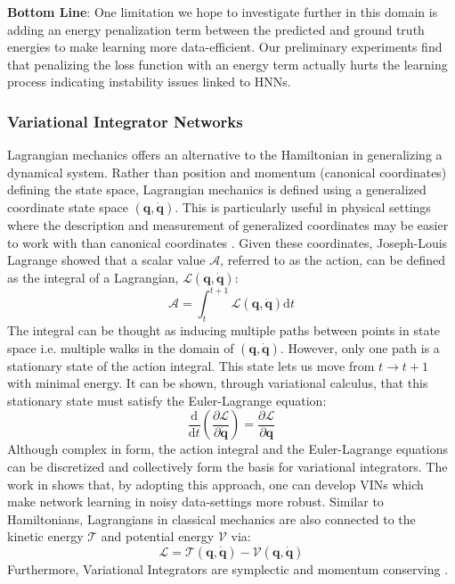 \documentclass{article}
\begin{document}
\textbf{Bottom Line}: One limitation we hope to investigate further in this domain is adding an energy penalization term between the predicted and ground truth energies to make learning more data-efficient. Our preliminary experiments find that penalizing the loss function with an energy term actually hurts the learning process indicating instability issues linked to HNNs. 

\subsubsection{Variational Integrator Networks}

Lagrangian mechanics offers an alternative to the Hamiltonian in generalizing a dynamical system. Rather than position and momentum (canonical coordinates) defining the state space, Lagrangian mechanics is defined using a generalized coordinate state space $(\mathbf{q},\dot{\mathbf{q}})$. This is particularly useful in physical settings where the description and measurement of generalized coordinates may be easier to work with than canonical coordinates \cite{marsden_discrete_2001}. Given these coordinates, Joseph-Louis Lagrange showed that a scalar value $\mathcal{A}$, referred to as the action, can be defined as the integral of a Lagrangian, $\mathcal{L}(\mathbf{q},\dot{\mathbf{q}})$:
\begin{equation}
\mathcal{A} = \int_{t}^{t+1} \mathcal{L}(\mathbf{q},\dot{\mathbf{q}}) \mathrm{d}t
\label{eqn.action_integral}
\end{equation}
The integral can be thought as inducing multiple paths between points in state space i.e. multiple walks in the domain of $(\mathbf{q},\mathbf{\dot{q}})$. However, only one path is a stationary state of the action integral. This state lets us move from $t \rightarrow t+1$ with minimal energy. It can be shown, through variational calculus, that this stationary state must satisfy the Euler-Lagrange equation:
\begin{equation}
\frac{\mathrm{d} }{\mathrm{d}t} \left ( \frac{\partial \mathcal{L}}{\partial \dot{\mathbf{q}}} \right )= \frac{\partial \mathcal{L}}{\partial \mathbf{q}}
\label{eqn.euler_lagrange}
\end{equation}
Although complex in form, the action integral and the Euler-Lagrange equations can be discretized and collectively form the basis for variational integrators. The work in \cite{saemundsson_variational_2019} shows that, by adopting this approach, one can develop VINs which make network learning in noisy data-settings more robust. Similar to Hamiltonians, Lagrangians in classical mechanics are also connected to the kinetic energy $\mathcal{T}$ and potential energy $\mathcal{V}$ via:
\begin{equation}
\mathcal{L} = \mathcal{T}(\mathbf{q},\mathbf{\dot{q}}) - \mathcal{V} (\mathbf{q},\mathbf{\dot{q}})
\end{equation}
Furthermore, Variational Integrators are symplectic and momentum conserving \cite{lew_overview_nodate}.
\end{document}
